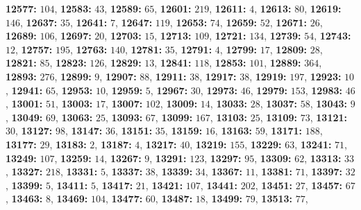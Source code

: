 \textsf{\bfseries 12577:} $104$, \textsf{\bfseries 12583:} $43$, \textsf{\bfseries 12589:} $65$, \textsf{\bfseries 12601:} $219$, \textsf{\bfseries 12611:} $4$, \textsf{\bfseries 12613:} $80$, \textsf{\bfseries 12619:} $146$, \textsf{\bfseries 12637:} $35$, \textsf{\bfseries 12641:} $7$, \textsf{\bfseries 12647:} $119$, \textsf{\bfseries 12653:} $74$, \textsf{\bfseries 12659:} $52$, \textsf{\bfseries 12671:} $26$, \textsf{\bfseries 12689:} $106$, \textsf{\bfseries 12697:} $20$, \textsf{\bfseries 12703:} $15$, \textsf{\bfseries 12713:} $109$, \textsf{\bfseries 12721:} $134$, \textsf{\bfseries 12739:} $54$, \textsf{\bfseries 12743:} $12$, \textsf{\bfseries 12757:} $195$, \textsf{\bfseries 12763:} $140$, \textsf{\bfseries 12781:} $35$, \textsf{\bfseries 12791:} $4$, \textsf{\bfseries 12799:} $17$, \textsf{\bfseries 12809:} $28$, \textsf{\bfseries 12821:} $85$, \textsf{\bfseries 12823:} $126$, \textsf{\bfseries 12829:} $13$, \textsf{\bfseries 12841:} $118$, \textsf{\bfseries 12853:} $101$, \textsf{\bfseries 12889:} $364$, \textsf{\bfseries 12893:} $276$, \textsf{\bfseries 12899:} $9$, \textsf{\bfseries 12907:} $88$, \textsf{\bfseries 12911:} $38$, \textsf{\bfseries 12917:} $38$, \textsf{\bfseries 12919:} $197$, \textsf{\bfseries 12923:} $10$, \textsf{\bfseries 12941:} $65$, \textsf{\bfseries 12953:} $10$, \textsf{\bfseries 12959:} $5$, \textsf{\bfseries 12967:} $30$, \textsf{\bfseries 12973:} $46$, \textsf{\bfseries 12979:} $153$, \textsf{\bfseries 12983:} $46$, \textsf{\bfseries 13001:} $51$, \textsf{\bfseries 13003:} $17$, \textsf{\bfseries 13007:} $102$, \textsf{\bfseries 13009:} $14$, \textsf{\bfseries 13033:} $28$, \textsf{\bfseries 13037:} $58$, \textsf{\bfseries 13043:} $9$, \textsf{\bfseries 13049:} $69$, \textsf{\bfseries 13063:} $25$, \textsf{\bfseries 13093:} $67$, \textsf{\bfseries 13099:} $167$, \textsf{\bfseries 13103:} $25$, \textsf{\bfseries 13109:} $73$, \textsf{\bfseries 13121:} $30$, \textsf{\bfseries 13127:} $98$, \textsf{\bfseries 13147:} $36$, \textsf{\bfseries 13151:} $35$, \textsf{\bfseries 13159:} $16$, \textsf{\bfseries 13163:} $59$, \textsf{\bfseries 13171:} $188$, \textsf{\bfseries 13177:} $29$, \textsf{\bfseries 13183:} $2$, \textsf{\bfseries 13187:} $4$, \textsf{\bfseries 13217:} $40$, \textsf{\bfseries 13219:} $155$, \textsf{\bfseries 13229:} $63$, \textsf{\bfseries 13241:} $71$, \textsf{\bfseries 13249:} $107$, \textsf{\bfseries 13259:} $14$, \textsf{\bfseries 13267:} $9$, \textsf{\bfseries 13291:} $123$, \textsf{\bfseries 13297:} $95$, \textsf{\bfseries 13309:} $62$, \textsf{\bfseries 13313:} $33$, \textsf{\bfseries 13327:} $218$, \textsf{\bfseries 13331:} $5$, \textsf{\bfseries 13337:} $38$, \textsf{\bfseries 13339:} $34$, \textsf{\bfseries 13367:} $11$, \textsf{\bfseries 13381:} $71$, \textsf{\bfseries 13397:} $32$, \textsf{\bfseries 13399:} $5$, \textsf{\bfseries 13411:} $5$, \textsf{\bfseries 13417:} $21$, \textsf{\bfseries 13421:} $107$, \textsf{\bfseries 13441:} $202$, \textsf{\bfseries 13451:} $27$, \textsf{\bfseries 13457:} $67$, \textsf{\bfseries 13463:} $8$, \textsf{\bfseries 13469:} $104$, \textsf{\bfseries 13477:} $60$, \textsf{\bfseries 13487:} $18$, \textsf{\bfseries 13499:} $79$, \textsf{\bfseries 13513:} $77$, 
